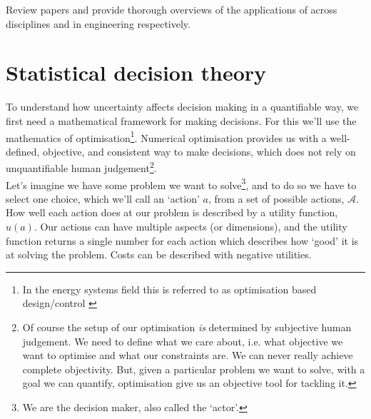 Review papers \citep{keisler2014ValueInformationAnalysis} and \citep{zhang2021ValueInformationAnalysis} provide thorough overviews of the applications of  across disciplines and in engineering respectively.


\section{Statistical decision theory} \label{sec:methodology-statistical-decision-theory}


To understand how uncertainty affects decision making in a quantifiable way, we first need a mathematical framework for making decisions. For this we'll use the mathematics of optimisation\footnote{In the energy systems field this is referred to as optimisation based design/control \citep{barber2022ReviewOptimizationBased}}. Numerical optimisation provides us with a well-defined, objective, and consistent way to make decisions, which does not rely on unquantifiable human judgement\footnote{Of course the setup of our optimisation \textit{is} determined by subjective human judgement. We need to define what we care about, i.e. what objective we want to optimise and what our constraints are. We can never really achieve complete objectivity. But, given a particular problem we want to solve, with a goal we can quantify, optimisation give us an objective tool for tackling it.}.\\

Let's imagine we have some problem we want to solve\footnote{We are the decision maker, also called the `actor'.}, and to do so we have to select one choice, which we'll call an `action' $a$, from a set of possible actions, $\mathcal{A}$. How well each action does at our problem is described by a utility function, $u(a)$. Our actions can have multiple aspects (or dimensions), and the utility function returns a single number for each action which describes how `good' it is at solving the problem. %
Costs can be described with negative utilities.

